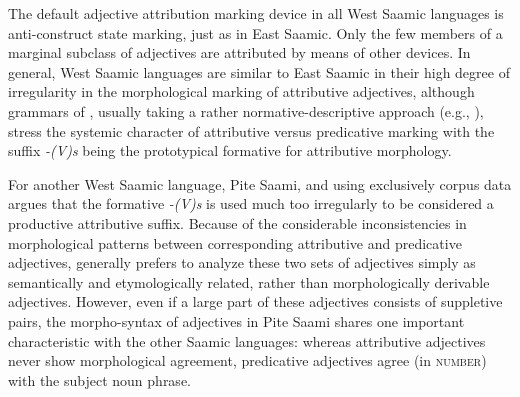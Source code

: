 The default adjective attribution marking device in all West Saamic languages is anti\hyp{}construct state marking, just as in East Saamic. Only the few members of a marginal subclass of adjectives are attributed by means of other devices. In general, West Saamic languages are similar to East Saamic in their high degree of irregularity in the morphological marking of attributive adjectives, although grammars of , usually taking a rather normative-descriptive approach (e.g., \citealt{nickel1990,sammallahti1998b,svonni2009a}), stress the systemic character of attributive versus predicative marking with the suffix \textit{-(V)s} being the prototypical  formative for attributive morphology.

For another West Saamic language, Pite Saami, and using exclusively corpus data \citet[128–129]{wilbur2014a} argues that the formative \textit{-(V)s} is used much too irregularly to be considered a productive attributive suffix. Because of the considerable inconsistencies in morphological patterns between corresponding attributive and predicative adjectives, \citet[134]{wilbur2014a} generally prefers to analyze these two sets of adjectives simply as semantically and etymologically related, rather than morphologically derivable adjectives. However, even if a large part of these adjectives consists of suppletive pairs, the morpho-syntax of adjectives in Pite Saami shares one important characteristic with the other Saamic languages: whereas attributive adjectives never show morphological agreement, predicative adjectives agree (in \textsc{number}) with the subject noun phrase.

